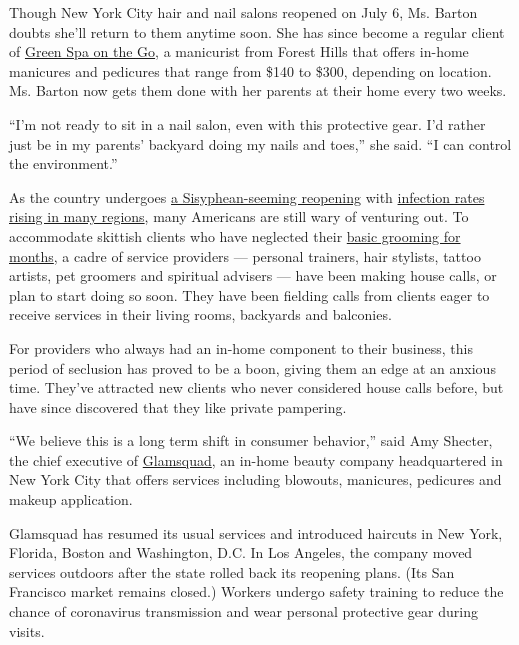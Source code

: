 Though New York City hair and nail salons reopened on July 6, Ms. Barton
doubts she'll return to them anytime soon. She has since become a
regular client of \href{http://www.greenspaonthego.com/}{Green Spa on
the Go}, a manicurist from Forest Hills that offers in-home manicures
and pedicures that range from \$140 to \$300, depending on location. Ms.
Barton now gets them done with her parents at their home every two
weeks.

``I'm not ready to sit in a nail salon, even with this protective gear.
I'd rather just be in my parents' backyard doing my nails and toes,''
she said. ``I can control the environment.''

As the country undergoes
\href{https://www.nytimes3xbfgragh.onion/interactive/2020/us/states-reopen-map-coronavirus.html}{a
Sisyphean-seeming reopening} with
\href{https://www.nytimes3xbfgragh.onion/interactive/2020/us/coronavirus-us-cases.html?action=click\&pgtype=Article\&state=default\&module=styln-coronavirus\&region=TOP_BANNER\&context=storylines_menu\#states}{infection
rates rising in many regions}, many Americans are still wary of
venturing out. To accommodate skittish clients who have neglected their
\href{https://www.nytimes3xbfgragh.onion/2020/04/21/smarter-living/maybe-consider-shaving-that-pandemic-beard.html}{basic
grooming for months}, a cadre of service providers --- personal
trainers, hair stylists, tattoo artists, pet groomers and spiritual
advisers --- have been making house calls, or plan to start doing so
soon. They have been fielding calls from clients eager to receive
services in their living rooms, backyards and balconies.

For providers who always had an in-home component to their business,
this period of seclusion has proved to be a boon, giving them an edge at
an anxious time. They've attracted new clients who never considered
house calls before, but have since discovered that they like private
pampering.

``We believe this is a long term shift in consumer behavior,'' said Amy
Shecter, the chief executive of
\href{https://www.glamsquad.com/}{Glamsquad}, an in-home beauty company
headquartered in New York City that offers services including blowouts,
manicures, pedicures and makeup application.

Glamsquad has resumed its usual services and introduced haircuts in New
York, Florida, Boston and Washington, D.C. In Los Angeles, the company
moved services outdoors after the state rolled back its reopening plans.
(Its San Francisco market remains closed.) Workers undergo safety
training to reduce the chance of coronavirus transmission and wear
personal protective gear during visits.

